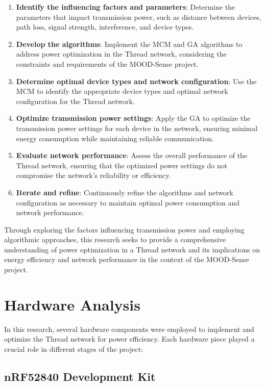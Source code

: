 \begin{enumerate}
    \item \textbf{Identify the influencing factors and parameters}: Determine the parameters that impact transmission power, such as distance between devices, path loss, signal strength, interference, and device types.
    \item \textbf{Develop the algorithms}: Implement the MCM and GA algorithms to address power optimization in the Thread network, considering the constraints and requirements of the MOOD-Sense project.
    \item \textbf{Determine optimal device types and network configuration}: Use the MCM to identify the appropriate device types and optimal network configuration for the Thread network.
    \item \textbf{Optimize transmission power settings}: Apply the GA to optimize the transmission power settings for each device in the network, ensuring minimal energy consumption while maintaining reliable communication.
    \item \textbf{Evaluate network performance}: Assess the overall performance of the Thread network, ensuring that the optimized power settings do not compromise the network's reliability or efficiency.
    \item \textbf{Iterate and refine}: Continuously refine the algorithms and network configuration as necessary to maintain optimal power consumption and network performance.
\end{enumerate}

Through exploring the factors influencing transmission power and employing algorithmic approaches, this research seeks to provide a comprehensive understanding of power optimization in a Thread network and its implications on energy efficiency and network performance in the context of the MOOD-Sense project.


\section{Hardware Analysis}

In this research, several hardware components were employed to implement and optimize the Thread network for power efficiency. Each hardware piece played a crucial role in different stages of the project:

\subsection{nRF52840 Development Kit}

